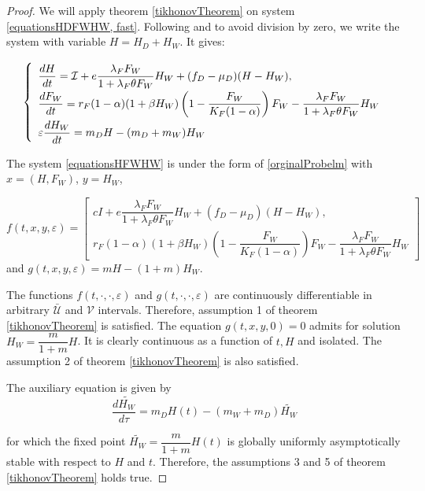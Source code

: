 \documentclass{article}
\newcommand{\lfw}{\lambda_{F}}
\newcommand{\lfw}{\lambda_{F}}
\newcommand{\cI}{\mathcal{I}}
\renewcommand{\epsilon}{\varepsilon}
\begin{document}
\begin{proof}

We will apply theorem \ref{tikhonovTheorem} on system \eqref{equationsHDFWHW, fast}. Following \cite{banasiak_methods_2014} and to avoid division by zero, we write the system with variable $H = H_D + H_W$. It gives:

\begin{equation} \label{equationsHFWHW} 
\def\arraystretch{2}
\left\{ 
\begin{array}{l}
\dfrac{dH}{dt}= \cI + e\dfrac{\lfw F_W}{1 + \lfw \theta F_W}H_W + (f_D - \mu_D)(H - H_W), \\
\dfrac{dF_W}{dt} = r_F(1- \alpha) (1+ \beta H_W) \left(1 - \dfrac{F_W}{K_F(1-\alpha)} \right) F_W - \dfrac{\lfw F_W}{1 + \lfw \theta F_W} H_W \\
\epsilon \dfrac{dH_W}{dt}= m_D H - (m_D + m_W) H_W
\end{array} \right.
\end{equation}

The system \eqref{equationsHFWHW} is under the form of \eqref{orginalProbelm} with $x = (H, F_W)$, $y = H_W$,  

$$f(t,x,y,\epsilon) = \begin{bmatrix}
cI + e\dfrac{\lfw F_W}{1 + \lfw \theta F_W}H_W + (f_D - \mu_D) (H - H_W), \\
r_F(1- \alpha) (1+ \beta H_W) \left(1 - \dfrac{F_W}{K_F(1-\alpha)} \right) F_W - \dfrac{\lfw F_W}{1 + \lfw \theta F_W} H_W
\end{bmatrix}  $$
and $g(t,x,y,\epsilon) = m H - (1 + m)H_W $.

The functions $f(t, \cdot, \cdot, \epsilon)$ and $g(t, \cdot, \cdot, \epsilon)$ are continuously differentiable in arbitrary $\mathcal{\bar{U}}$ and $\mathcal{V}$ intervals. Therefore, assumption 1 of theorem \eqref{tikhonovTheorem} is satisfied. The equation $ g(t,x,y,0) =  0$ admits for solution $H_W = \dfrac{m}{1+m}H$. It is clearly continuous as a function of $t, H$ and isolated. The assumption 2 of theorem \eqref{tikhonovTheorem} is also satisfied.

The auxiliary equation is given by
\begin{equation*}
\dfrac{d \tilde{H_W}}{d \tau} = m_D H(t) - (m_W + m_D)\tilde{H_W}
\end{equation*}

for which the fixed point $\tilde{H_W} = \dfrac{m}{1+m}H(t)$ is globally uniformly asymptotically stable with respect to $H$ and $t$. Therefore, the assumptions 3 and 5 of theorem \eqref{tikhonovTheorem} holds true.


\end{proof}
\end{document}
